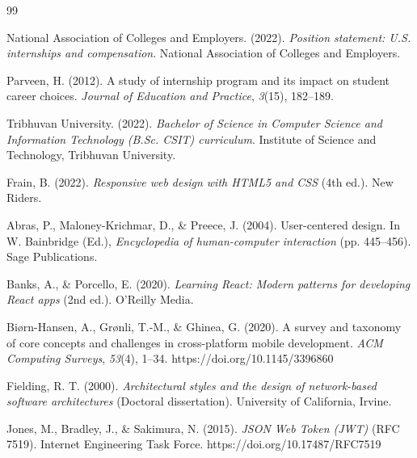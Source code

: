 \begin{thebibliography}{99}


National Association of Colleges and Employers. (2022). \textit{Position statement: U.S. internships and compensation}. National Association of Colleges and Employers.

Parveen, H. (2012). A study of internship program and its impact on student career choices. \textit{Journal of Education and Practice}, \textit{3}(15), 182--189.

Tribhuvan University. (2022). \textit{Bachelor of Science in Computer Science and Information Technology (B.Sc. CSIT) curriculum}. Institute of Science and Technology, Tribhuvan University.

Frain, B. (2022). \textit{Responsive web design with HTML5 and CSS} (4th ed.). New Riders.

Abras, P., Maloney-Krichmar, D., \& Preece, J. (2004). User-centered design. In W. Bainbridge (Ed.),
\textit{Encyclopedia of human-computer interaction} (pp. 445--456). Sage Publications.

Banks, A., \& Porcello, E. (2020). \textit{Learning React: Modern patterns for developing React apps} (2nd ed.). O'Reilly Media.

Bi\o rn-Hansen, A., Gr\o nli, T.-M., \& Ghinea, G. (2020). A survey and taxonomy of core concepts and challenges in cross-platform mobile development. \textit{ACM Computing Surveys}, \textit{53}(4), 1--34. https://doi.org/10.1145/3396860

Fielding, R. T. (2000). \textit{Architectural styles and the design of network-based software architectures} (Doctoral dissertation). University of California, Irvine.

Jones, M., Bradley, J., \& Sakimura, N. (2015). \textit{JSON Web Token (JWT)} (RFC 7519). Internet Engineering Task Force. https://doi.org/10.17487/RFC7519


\end{thebibliography}
